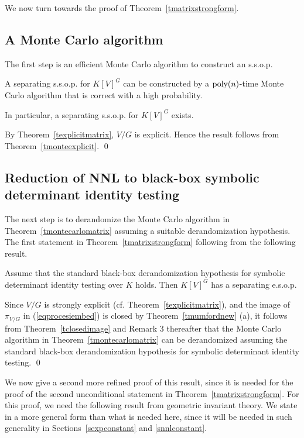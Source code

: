 \documentclass[11pt]{article}
\begin{document}
We now turn towards the proof of Theorem~\ref{tmatrixstrongform}.

\subsection{A Monte Carlo algorithm} 
The first step is an efficient  Monte Carlo algorithm to construct an s.s.o.p.

\begin{theorem} \label{tmontecarlomatrix}
A separating  s.s.o.p. for $K[V]^G$ can be constructed by a ${\mbox {poly}}(n)$-time Monte Carlo algorithm that is correct with a high probability.

In particular, a separating  s.s.o.p. for $K[V]^G$ exists.
\end{theorem} 
\proof By Theorem~\ref{texplicitmatrix}, $V/G$ is explicit. Hence the result follows from Theorem~\ref{tmonteexplicit}.
\qed 



\subsection{Reduction of  NNL to black-box symbolic determinant identity testing} 
\label{ssditcond}
The next step is to derandomize the Monte Carlo algorithm in Theorem~\ref{tmontecarlomatrix}
assuming a suitable derandomization hypothesis. The first statement in Theorem~\ref{tmatrixstrongform} following from
the following result.

\begin{theorem} \label{tmatrixmain}
Assume that the standard 
black-box derandomization hypothesis for  symbolic determinant identity testing over $K$ holds. 
Then $K[V]^G$ has a separating   e.s.o.p.
\end{theorem} 



\proof 
Since $V/G$ is strongly explicit (cf. Theorem~\ref{texplicitmatrix}), and the image of $\pi_{V/G}$ in (\ref{eqprocesiembed}) is closed
by Theorem~\ref{tmumfordnew} (a), 
it follows from Theorem~\ref{tclosedimage} and Remark 3 thereafter  that the Monte Carlo algorithm in Theorem~\ref{tmontecarlomatrix} 
can be derandomized assuming the standard  black-box derandomization hypothesis for symbolic determinant identity testing.  \qed 

We now give a second more refined proof of this  result, since it  is needed for the proof of the  second unconditional statement in
Theorem~\ref{tmatrixstrongform}.
For this proof,  we need the following  result from 
geometric invariant theory. 
We state in a more general form than what is needed here, since it will 
be needed in such generality in Sections~\ref{sexpconstant}  and \ref{snnlconstant}.
\end{document}
